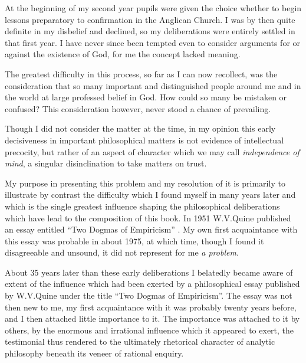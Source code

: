 At the beginning of my second year pupils were given the choice whether to begin lessons preparatory to confirmation in the Anglican Church.
I was by then quite definite in my disbelief and declined, so my deliberations were entirely settled in that first year.
I have never since been tempted even to consider arguments for or against the existence of God, for me the concept lacked meaning.

The greatest difficulty in this process, so far as I can now recollect, was the consideration that so many important and distinguished people around me and in the world at large professed belief in God.
How could so many be mistaken or confused?
This consideration however, never stood a chance of prevailing.

Though I did not consider the matter at the time, in my opinion this early decisiveness in important philosophical matters is not evidence of intellectual precocity, but rather of an aspect of character which we may call {\it independence of mind}, a singular disinclination to take matters on trust.

My purpose in presenting this problem and my resolution of it is primarily to illustrate by contrast the difficulty which I found myself in many years later and which is the single greatest influence shaping the philosophical deliberations which have lead to the composition of this book.
In 1951 W.V.Quine published an essay entitled ``Two Dogmas of Empiricism'' \cite{quine51}.
My own first acquaintance with this essay was probable in about 1975, at which time, though I found it disagreeable and unsound, it did not represent for me {\it a problem}.

About 35 years later than these early deliberations I belatedly became aware of extent of the influence which had been exerted by a philosophical essay published by W.V.Quine under the title ``Two Dogmas of Empiricism''.
The essay was not then new to me, my first acquaintance with it was probably twenty years before, and I then attached little importance to it.
The importance was attached to it by others, by the enormous and irrational influence which it appeared to exert, the testimonial thus rendered to the ultimately rhetorical character of analytic philosophy beneath its veneer of rational enquiry.



